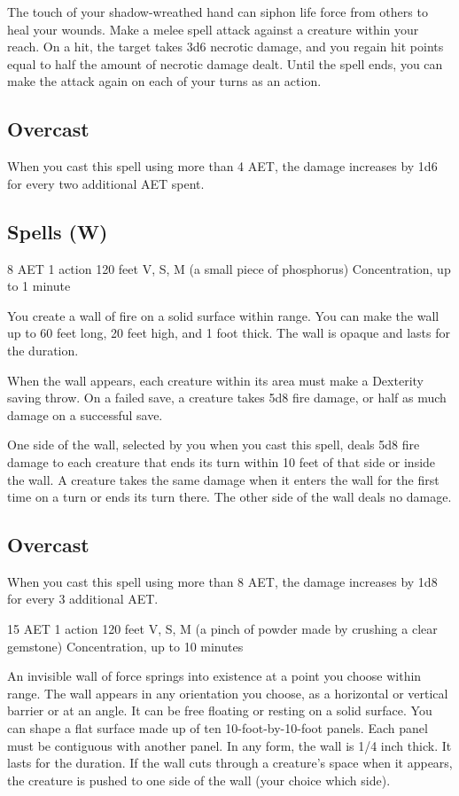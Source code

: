 The touch of your shadow-wreathed hand can siphon life force from others to heal your wounds. Make a melee spell attack against a creature within your reach. On a hit, the target takes 3d6 necrotic damage, and you regain hit points equal to half the amount of necrotic damage dealt. Until the spell ends, you can make the attack again on each of your turns as an action.

\subsection*{Overcast} When you cast this spell using more than 4 AET, the damage increases by 1d6 for every two additional AET spent.

\subsection{Spells (W)}

{8 AET}
{1 action}
{120 feet}
{V, S, M (a small piece of phosphorus)}
{Concentration, up to 1 minute}

You create a wall of fire on a solid surface within range. You can make the wall up to 60 feet long, 20 feet high, and 1 foot thick. The wall is opaque and lasts for the duration.

When the wall appears, each creature within its area must make a Dexterity saving throw. On a failed save, a creature takes 5d8 fire damage, or half as much damage on a successful save.

One side of the wall, selected by you when you cast this spell, deals 5d8 fire damage to each creature that ends its turn within 10 feet of that side or inside the wall. A creature takes the same damage when it enters the wall for the first time on a turn or ends its turn there. The other side of the wall deals no damage.

\subsection*{Overcast} When you cast this spell using more than 8 AET, the damage increases by 1d8 for every 3 additional AET.


{15 AET}
{1 action}
{120 feet}
{V, S, M (a pinch of powder made by crushing a clear gemstone)}
{Concentration, up to 10 minutes}

An invisible wall of force springs into existence at a point you choose within range. The wall appears in any orientation you choose, as a horizontal or vertical barrier or at an angle. It can be free floating or resting on a solid surface. You can shape a flat surface made up of ten 10-foot-by-10-foot panels. Each panel must be contiguous with another panel. In any form, the wall is 1/4 inch thick. It lasts for the duration. If the wall cuts through a creature's space when it appears, the creature is pushed to one side of the wall (your choice which side).

